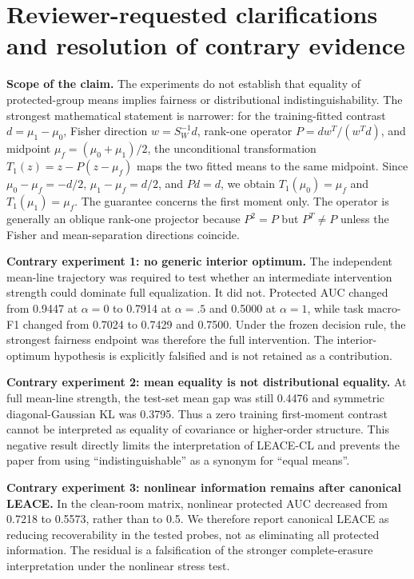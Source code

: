 \section*{Reviewer-requested clarifications and resolution of contrary evidence}
\textbf{Scope of the claim.} The experiments do not establish that equality of protected-group means implies fairness or distributional indistinguishability. The strongest mathematical statement is narrower: for the training-fitted contrast $d=\mu_1-\mu_0$, Fisher direction $w=S_W^{-1}d$, rank-one operator $P=dw^T/(w^Td)$, and midpoint $\mu_f=(\mu_0+\mu_1)/2$, the unconditional transformation $T_1(z)=z-P(z-\mu_f)$ maps the two fitted means to the same midpoint. Since $\mu_0-\mu_f=-d/2$, $\mu_1-\mu_f=d/2$, and $Pd=d$, we obtain $T_1(\mu_0)=\mu_f$ and $T_1(\mu_1)=\mu_f$. The guarantee concerns the first moment only. The operator is generally an oblique rank-one projector because $P^2=P$ but $P^T\neq P$ unless the Fisher and mean-separation directions coincide.

\textbf{Contrary experiment 1: no generic interior optimum.} The independent mean-line trajectory was required to test whether an intermediate intervention strength could dominate full equalization. It did not. Protected AUC changed from 0.9447 at $\alpha=0$ to 0.7914 at $\alpha=.5$ and 0.5000 at $\alpha=1$, while task macro-F1 changed from 0.7024 to 0.7429 and 0.7500. Under the frozen decision rule, the strongest fairness endpoint was therefore the full intervention. The interior-optimum hypothesis is explicitly falsified and is not retained as a contribution.

\textbf{Contrary experiment 2: mean equality is not distributional equality.} At full mean-line strength, the test-set mean gap was still 0.4476 and symmetric diagonal-Gaussian KL was 0.3795. Thus a zero training first-moment contrast cannot be interpreted as equality of covariance or higher-order structure. This negative result directly limits the interpretation of LEACE-CL and prevents the paper from using ``indistinguishable'' as a synonym for ``equal means''.

\textbf{Contrary experiment 3: nonlinear information remains after canonical LEACE.} In the clean-room matrix, nonlinear protected AUC decreased from 0.7218 to 0.5573, rather than to 0.5. We therefore report canonical LEACE as reducing recoverability in the tested probes, not as eliminating all protected information. The residual is a falsification of the stronger complete-erasure interpretation under the nonlinear stress test.

